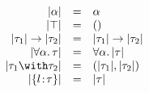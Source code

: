 
\[
\begin{array}{rcl}
  \im \alpha                     & = & \alpha \\
  \im \top                  & = & () \\
  \im {\tau_1} \to \im {\tau_2} & = & \im {\tau_1} \to \im {\tau_2} \\
  \im {\for \alpha \tau}      & = & \for \alpha \im \tau \\
  \im {\tau_1 \andop \tau_2}   & = & \pair {\im {\tau_1}} {\im {\tau_2}} \\
  \im {\recty l \tau}            & = & \im \tau
\end{array}
\]